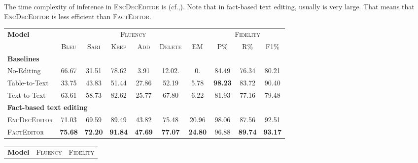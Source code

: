 \documentclass[11pt,a4paper]{article}
\begin{document}
The time complexity of inference in \textsc{EncDecEditor} is  (cf.,\citet{britz2017efficient}). Note that in fact-based text editing, usually  is very large. That means that \textsc{EncDecEditor} is less efficient than \textsc{FactEditor}.

\begin{table*}[t]
    \begin{subtable}[t]{\textwidth}
        \centering
        \small
        \begin{tabular}{l|c|cccc|c|ccc}
            \toprule
            \multirow{2}{*}{\textbf{Model}} &  \multicolumn{6}{c|}{\textsc{Fluency}} &  \multicolumn{3}{c}{\textsc{Fidelity}} \\
            &\textsc{Bleu} & \textsc{Sari} & \textsc{Keep} & \textsc{Add} & \textsc{Delete} & \textsc{EM} & P\% & R\% & F1\%\\
            \midrule
            \multicolumn{10}{l}{\textbf{Baselines}}\\
            No-Editing              & 66.67 & 31.51 & 78.62 & 3.91 & 12.02. & 0. & 84.49 & 76.34 & 80.21\\
            Table-to-Text       & 33.75 & 43.83 & 51.44 & 27.86 & 52.19 & 5.78 & \textbf{98.23} & 83.72 & 90.40\\
            Text-to-Text       & 63.61 & 58.73 & 82.62 & 25.77 & 67.80 & 6.22 & 81.93 & 77.16 & 79.48\\
            \midrule
            \multicolumn{10}{l}{\textbf{Fact-based text editing}}\\
            \textsc{EncDecEditor} & 71.03 & 69.59 & 89.49 & 43.82 & 75.48 & 20.96 & 98.06 & 87.56 & 92.51\\
            \textsc{FactEditor} & \textbf{75.68} & \textbf{72.20} & \textbf{91.84} & \textbf{47.69} & \textbf{77.07} & \textbf{24.80} & 96.88 & \textbf{89.74} & \textbf{93.17}\\
            \bottomrule
        \end{tabular}
        \caption{\textsc{WebEdit}}
        \label{tab:Experiment_webedit}
    \end{subtable}
    \newline
    \vspace*{1em}
    \newline
    \begin{subtable}[t]{\textwidth}
        \centering
        \small
        \begin{tabular}{l|c|cccc|c|ccc}
            \toprule
            \multirow{2}{*}{\textbf{Model}} &  \multicolumn{6}{c|}{\textsc{Fluency}} &  \multicolumn{3}{c}{\textsc{Fidelity}} \\

\end{tabular}
\end{subtable}
\end{table*}
\end{document}
